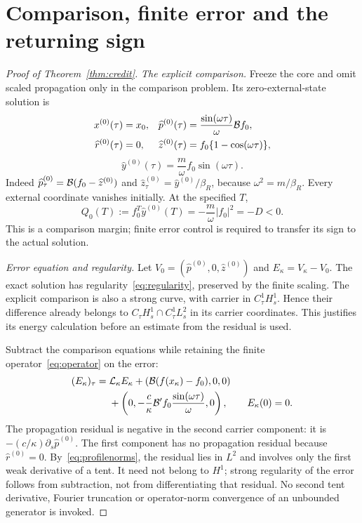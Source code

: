 \section{Comparison, finite error and the returning sign}\label{sec:comparison}
\begin{proof}[Proof of Theorem~\ref{thm:credit}]
\textit{The explicit comparison.}
Freeze the core and omit scaled propagation only in the comparison problem. Its zero-external-state solution is
\begin{equation}\label{eq:comparison}
\begin{aligned}
x^{(0)}(\tau)&=x_0,&
\widehat p^{(0)}(\tau)&=\frac{\sin(\omega\tau)}{\omega}\mathcal B f_0,\\
\widehat r^{(0)}(\tau)&=0,&
\widehat z^{(0)}(\tau)&=f_0\{1-\cos(\omega\tau)\},
\end{aligned}
\end{equation}
\begin{equation}\label{eq:comparisonoutput}
\widehat y^{(0)}(\tau)=\frac m\omega f_0\sin(\omega\tau).
\end{equation}
Indeed $\widehat p^{(0)}_\tau=\mathcal B(f_0-\widehat z^{(0)})$ and
$\widehat z^{(0)}_\tau=\widehat y^{(0)}/\beta_R$, because
$\omega^2=m/\beta_R$. Every external coordinate vanishes initially. At the specified $T$,
\begin{equation}\label{eq:comparisonmargin}
Q_0(T):=f_0^T\widehat y^{(0)}(T)
=-\frac m\omega|f_0|^2=-D<0.
\end{equation}
This is a comparison margin; finite error control is required to transfer its sign to the actual solution.

\textit{Error equation and regularity.}
Let $V_0=(\widehat p^{(0)},0,\widehat z^{(0)})$ and
$E_\kappa=V_\kappa-V_0$. The exact solution has regularity~\eqref{eq:regularity}, preserved by the finite scaling. The explicit comparison is also a strong curve, with carrier in $C^1_\tau H^1_s$. Hence their difference already belongs to $C_\tau H^1_s\cap C^1_\tau L^2_s$ in its carrier coordinates. This justifies its energy calculation before an estimate from the residual is used.

Subtract the comparison equations while retaining the finite operator~\eqref{eq:operator} on the error:
\begin{equation}\label{eq:error}
\begin{aligned}
(E_\kappa)_\tau={}&\mathcal L_\kappa E_\kappa
+(\mathcal B(f(x_\kappa)-f_0),0,0)\\
&+\left(0,-\frac c\kappa\mathcal B'f_0
                 \frac{\sin(\omega\tau)}{\omega},0\right),
\qquad E_\kappa(0)=0.
\end{aligned}
\end{equation}
The propagation residual is negative in the second carrier component:
it is $-(c/\kappa)\partial_s\widehat p^{(0)}$.
The first component has no propagation residual because
$\widehat r^{(0)}=0$. By~\eqref{eq:profilenorms}, the residual lies in $L^2$ and involves only the first weak derivative of a tent. It need not belong to $H^1$; strong regularity of the error follows from subtraction, not from differentiating that residual. No second tent derivative, Fourier truncation or operator-norm convergence of an unbounded generator is invoked.


\end{proof}

